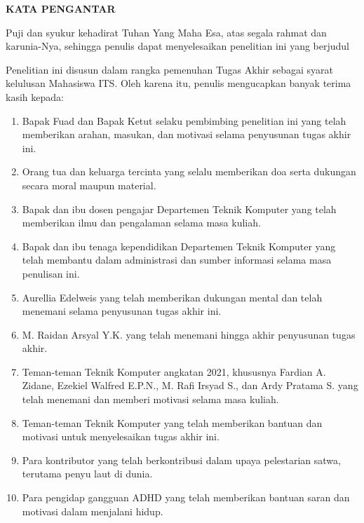 \begin{center}
  \Large
  \textbf{KATA PENGANTAR}
\end{center}


\vspace{2ex}


Puji dan syukur kehadirat Tuhan Yang Maha Esa, atas segala rahmat dan karunia-Nya, sehingga penulis dapat menyelesaikan penelitian ini yang berjudul \tatitle

Penelitian ini disusun dalam rangka pemenuhan Tugas Akhir sebagai syarat kelulusan Mahasiswa ITS. Oleh karena itu, penulis mengucapkan banyak terima kasih kepada:

\begin{enumerate}[nolistsep]
  \item Bapak Fuad dan Bapak Ketut selaku pembimbing penelitian ini yang telah memberikan arahan, masukan, dan  motivasi selama penyusunan tugas akhir ini.
  \item Orang tua dan keluarga tercinta yang selalu memberikan doa serta dukungan secara moral maupun material.
  \item Bapak dan ibu dosen pengajar Departemen Teknik Komputer yang telah memberikan ilmu dan pengalaman selama masa kuliah.
  \item Bapak dan ibu tenaga kependidikan Departemen Teknik Komputer yang telah membantu dalam administrasi dan sumber informasi selama masa penulisan ini.
  \item Aurellia Edelweis yang telah memberikan dukungan mental dan telah menemani selama penyusunan tugas akhir ini.
  \item M. Raidan Arsyal Y.K. yang telah menemani hingga akhir penyusunan tugas akhir.
  \item Teman-teman Teknik Komputer angkatan 2021, khususnya Fardian A. Zidane, Ezekiel Walfred E.P.N., M. Rafi Irsyad S., dan Ardy Pratama S. yang telah menemani dan memberi motivasi selama masa kuliah.
  \item Teman-teman Teknik Komputer yang telah memberikan bantuan dan motivasi untuk menyelesaikan tugas akhir ini. 
  \item Para kontributor yang telah berkontribusi dalam upaya pelestarian satwa, terutama penyu laut di dunia.
  \item Para pengidap gangguan ADHD yang telah memberikan bantuan saran dan motivasi dalam menjalani hidup.
\end{enumerate}

